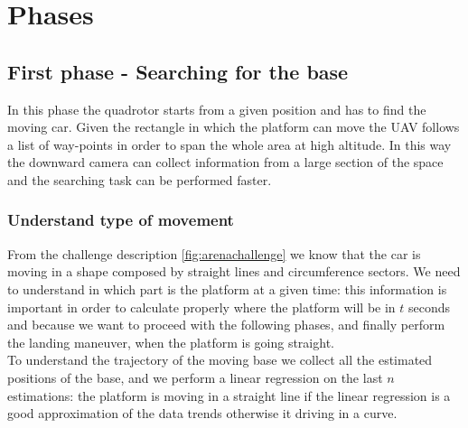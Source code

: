 \section{Phases}
\subsection{First phase - Searching for the base}
In this phase the quadrotor starts from a given position and has to find the moving car.
Given the rectangle in which the platform can move the UAV follows a list of way-points in order to span the whole area at high altitude. In this way the downward camera can collect information from a large section of the space and the searching task can be performed faster.\\

\subsubsection{Understand type of movement}
From the challenge description \ref{fig:arenachallenge} we know that the car is moving in a shape composed by straight lines and circumference sectors. We need to understand in which part is the platform at a given time: this information is important in order to calculate properly where the platform will be in $t$ seconds and because we want to proceed with the following phases, and finally perform the landing maneuver, when the platform is going straight.\\
To understand the trajectory of the moving base we collect all the estimated positions of the base, and we perform a linear regression on the last $n$ estimations: the platform is moving in a straight line if the linear regression is a good approximation of the data trends otherwise it driving in a curve.\\


